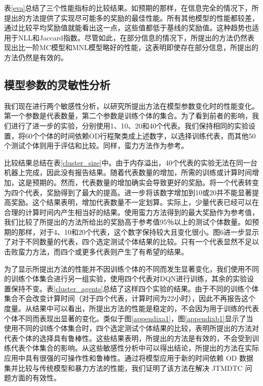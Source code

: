 表\ref{eva}总结了三个性能指标的比较结果。如预期的那样，在信息完全的情况下，所提出的方法提供了实现尽可能多的奖励的最佳性能。所有其他模型的性能都较差，通过比较平均奖励值就能看出这一点，这些值都低于基线的奖励值。这种趋势也适用于NLL和Jaccard指数。尽管如此，在部分信息的情况下，所提出的方法仍然表现出比一阶MC模型和MNL模型略好的性能，这表明即使存在部分信息，所提出的方法仍然是有效的。

\subsection{模型参数的灵敏性分析}

我们现在进行两个敏感性分析，以研究所提出方法在模型参数变化时的性能变化。第一个参数是代表数量，第二个参数是训练个体的集合。为了看到前者的影响，我们进行了进一步的实验，分别使用1、10、20和40个代表。我们保持相同的实验设置，将60个个体的时间依赖OD行程聚类成上述数字，以选择训练代表，而其他50个测试个体则用于评估和比较。同样，蛮力方法作为参考。

比较结果总结在表\ref{cluster_size}中。由于内存溢出，40个代表的实验无法在同一台机器上完成，因此没有报告结果。随着代表数量的增加，所需的训练或计算时间增加，这是预期的。然而，代表数量的增加确实会导致更好的奖励。将一个代表转变为四个代表，奖励得到了最大的提高。进一步将该数字增加到10或20并不能显著提高奖励。这个结果表明，增加代表数量不一定划算。实际上，少量代表已经可以在合理的计算时间内产生相当好的结果。使用蛮力方法得到的最大奖励作为参考值，我们比较了所提出的方法所给出的奖励高于参考值95％以上的测试个体数量。如预期的那样，对于4、10和20个代表，这个数字保持较大且变化很小。图6进一步显示了对于不同数量的代表，四个选定测试个体结果的比较。只有一个代表显然不足以击败蛮力方法，而四个或更多代表则产生了有希望的结果。

为了显示所提出方法的性能并不因训练个体的不同而发生显著变化，我们使用不同的训练个体集合进行另一组实验，使用四个代表对DQN进行训练，其余的实验设置保持不变。表\ref{cluster_agents}总结了这样四个实验的结果。由于不同的训练个体集合不会改变计算时间（对于四个代表，计算时间为22小时），因此不再报告这个度量。从结果中可以看出，所提出方法的性能是稳定的，不会因为用于训练的代表个体不同而表现出显著的变化。类似于图\ref{appendixa1}，图\ref{appendixb1}显示了当使用不同的训练个体集合时，四个选定测试个体结果的比较，表明所提出的方法对代表个体的选择具有鲁棒性。这些结果表明，所提出的方法是有效的，不会受到训练代表个体集合的影响。从这些敏感性分析中可以得出结论，所提出的方法在实际应用中具有很强的可操作性和鲁棒性。通过将模型应用于新的时间依赖 OD 数据集并比较与传统模型和暴力方法的性能，我们证明了该方法在解决 JTMDTC 问题方面的有效性。
